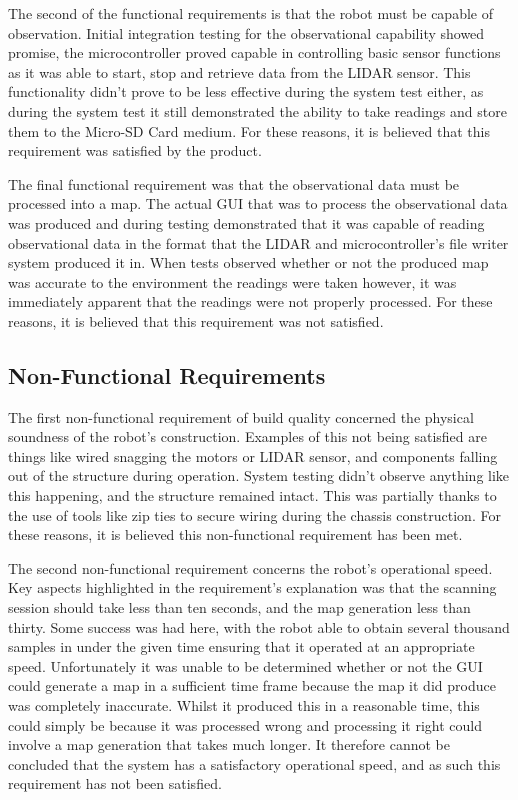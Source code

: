 		The second of the functional requirements is that the robot must be capable of observation. Initial integration testing for the observational capability showed promise, the microcontroller proved capable in controlling basic sensor functions as it was able to start, stop and retrieve data from the LIDAR sensor. This functionality didn't prove to be less effective during the system test either, as during the system test it still demonstrated the ability to take readings and store them to the Micro-SD Card medium. For these reasons, it is believed that this requirement was satisfied by the product.
		
		The final functional requirement was that the observational data must be processed into a map. The actual GUI that was to process the observational data was produced and during testing demonstrated that it was capable of reading observational data in the format that the LIDAR and microcontroller's file writer system produced it in. When tests observed whether or not the produced map was accurate to the environment the readings were taken however, it was immediately apparent that the readings were not properly processed. For these reasons, it is believed that this requirement was not satisfied.
	
		\subsection{Non-Functional Requirements}
		The first non-functional requirement of build quality concerned the physical soundness of the robot's construction. Examples of this not being satisfied are things like wired snagging the motors or LIDAR sensor, and components falling out of the structure during operation. System testing didn't observe anything like this happening, and the structure remained intact. This was partially thanks to the use of tools like zip ties to secure wiring during the chassis construction. For these reasons, it is believed this non-functional requirement has been met.
		
		The second non-functional requirement concerns the robot's operational speed. Key aspects highlighted in the requirement's explanation was that the scanning session should take less than ten seconds, and the map generation less than thirty. Some success was had here, with the robot able to obtain several thousand samples in under the given time ensuring that it operated at an appropriate speed. Unfortunately it was unable to be determined whether or not the GUI could generate a map in a sufficient time frame because the map it did produce was completely inaccurate. Whilst it produced this in a reasonable time, this could simply be because it was processed wrong and processing it right could involve a map generation that takes much longer. It therefore cannot be concluded that the system has a satisfactory operational speed, and as such this requirement has not been satisfied.
		
